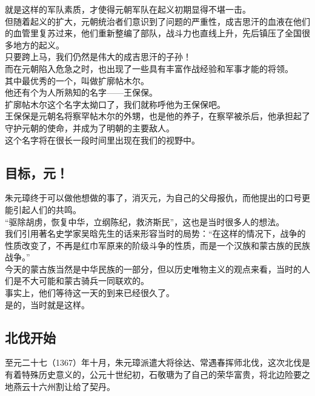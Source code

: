 \begin{multicols}{\theparacolNo}
就是这样的军队素质，才使得元朝军队在起义初期显得不堪一击。\\

但随着起义的扩大，元朝统治者们意识到了问题的严重性，成吉思汗的血液在他们的血管里复苏过来，他们重新整编了部队，战斗力也直线上升，先后镇压了全国很多地方的起义。\\

只要跨上马，我们仍然是伟大的成吉思汗的子孙！\\

而在元朝陷入危急之时，也出现了一些具有丰富作战经验和军事才能的将领。\\

其中最优秀的一个，叫做扩廓帖木尔。\\

他还有个为人所熟知的名字——王保保。\\

扩廓帖木尔这个名字太拗口了，我们就称呼他为王保保吧。\\

王保保是元朝名将察罕帖木尔的外甥，也是他的养子，在察罕被杀后，他承担起了守护元朝的使命，并成为了明朝的主要敌人。\\

这个名字将在很长一段时间里出现在我们的视野中。\\

\subsection{目标，元！}
朱元璋终于可以做他想做的事了，消灭元，为自己的父母报仇，而他提出的口号更能引起人们的共鸣。\\

“驱除胡虏，恢复中华，立纲陈纪，救济斯民”，这也是当时很多人的想法。\\

我们引用著名史学家吴晗先生的话来形容当时的局势：“在这样的情况下，战争的性质改变了，不再是红巾军原来的阶级斗争的性质，而是一个汉族和蒙古族的民族战争。”\\

今天的蒙古族当然是中华民族的一部分，但以历史唯物主义的观点来看，当时的人们是不大可能和蒙古骑兵一同联欢的。\\

事实上，他们等待这一天的到来已经很久了。\\

是的，当时就是这样。\\

\subsection{北伐开始}
至元二十七（1367）年十月，朱元璋派遣大将徐达、常遇春挥师北伐，这次北伐是有着特殊历史意义的，公元十世纪初，石敬瑭为了自己的荣华富贵，将北边险要之地燕云十六州割让给了契丹。\\


\end{multicols}

